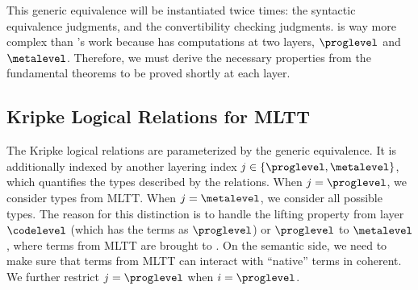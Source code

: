 This generic equivalence will be instantiated twice times: the syntactic equivalence
judgments, and the convertibility checking judgments. %
\delamlang is way more complex than \citet{abel_decidability_2017}'s work because
\delamlang has computations at two layers, $\proglevel$ and $\metalevel$. %
Therefore, we must derive the necessary properties from the fundamental theorems to be
proved shortly at each layer. %

\subsection{Kripke Logical Relations for MLTT}

The Kripke logical relations are parameterized by the generic equivalence. %
It is additionally indexed by another layering index $j \in \{\proglevel, \metalevel\}$, which
quantifies the types described by the relations. %
When $j = \proglevel$, we consider types from MLTT. %
When $j = \metalevel$, we consider all possible types. %
The reason for this distinction is to handle the lifting property from layer $\codelevel$
(which has the terms as $\proglevel$) or $\proglevel$ to
$\metalevel$, where terms from MLTT are brought to \delamlang. %
On the semantic side, we need to make sure that terms from MLTT can interact with
``native'' terms in \delamlang coherent. %
We further restrict $j = \proglevel$ when $i = \proglevel$. 

